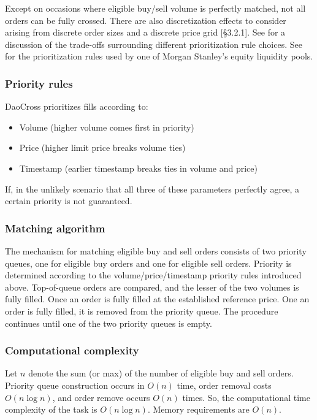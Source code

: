 \documentclass[11pt, reqno]{amsart}
\begin{document}
Except on occasions where eligible buy/sell volume is perfectly matched, not
all orders can be fully crossed. There are also discretization effects to
consider arising from discrete order sizes and a discrete price grid
\cite{BoBoDoGo18}[\S 3.2.1].
See \cite{BeLaLiVa22} for a discussion of the trade-offs surrounding
different prioritization rule choices. See \cite{MsAts} for the
prioritization rules used by one of Morgan Stanley's equity liquidity pools.

\subsubsection{Priority rules}
DaoCross prioritizes fills according to:
\begin{itemize}
	\item Volume (higher volume comes first in priority)
	\item Price (higher limit price breaks volume ties)
	\item Timestamp (earlier timestamp breaks ties in volume and price)
\end{itemize}
If, in the unlikely scenario that all three of these parameters perfectly
agree, a certain priority is not guaranteed.

\subsubsection{Matching algorithm}
The mechanism for matching eligible buy and sell orders consists of two
priority queues, one for eligible buy orders and one for eligible sell orders.
Priority is determined according to the volume/price/timestamp priority rules
introduced above. Top-of-queue orders are compared, and the lesser of the two
volumes is fully filled. Once an order is fully filled at the established
reference price. One an order is fully filled, it is removed from the priority
queue. The procedure continues until one of the two priority queues is empty.

\subsubsection{Computational complexity}
Let $n$ denote the sum (or max) of the number of eligible buy and sell orders.
Priority queue construction occurs in $O(n)$ time, order removal costs
$O(n \log n)$, and order remove occurs $O(n)$ times. So, the computational
time complexity of the task is $O(n \log n)$. Memory requirements are $O(n)$.
\end{document}
